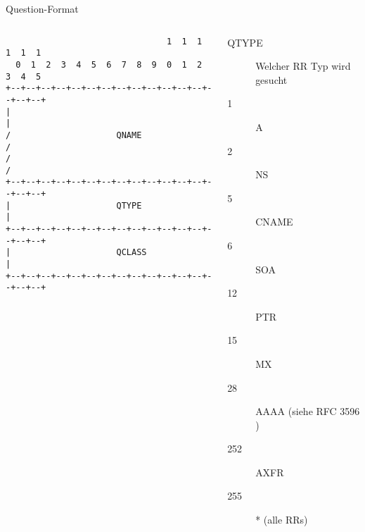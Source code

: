 \documentclass{beamer}
\begin{document}
  \begin{frame}[fragile]{\mytitle}{Question-Format}
    \begin{columns}[c]
      \column{5cm}
      \tiny{
        \begin{verbatim}
                                1  1  1  1  1  1
  0  1  2  3  4  5  6  7  8  9  0  1  2  3  4  5
+--+--+--+--+--+--+--+--+--+--+--+--+--+--+--+--+
|                                               |
/                     QNAME                     /
/                                               /
+--+--+--+--+--+--+--+--+--+--+--+--+--+--+--+--+
|                     QTYPE                     |
+--+--+--+--+--+--+--+--+--+--+--+--+--+--+--+--+
|                     QCLASS                    |
+--+--+--+--+--+--+--+--+--+--+--+--+--+--+--+--+
        \end{verbatim}
      }
      \column{7cm}
        \footnotesize{
       \begin{description}
          \item[QTYPE] Welcher RR Typ wird gesucht
          \item[1] A
          \item[2] NS
          \item[5] CNAME
          \item[6] SOA
          \item[12] PTR
          \item[15] MX
          \item[28] AAAA (siehe RFC 3596 \cite{rfc3596})
          \item[252] AXFR
          \item[255] * (alle RRs)
        \end{description}
      }
    \end{columns}
\end{frame}
\end{document}
